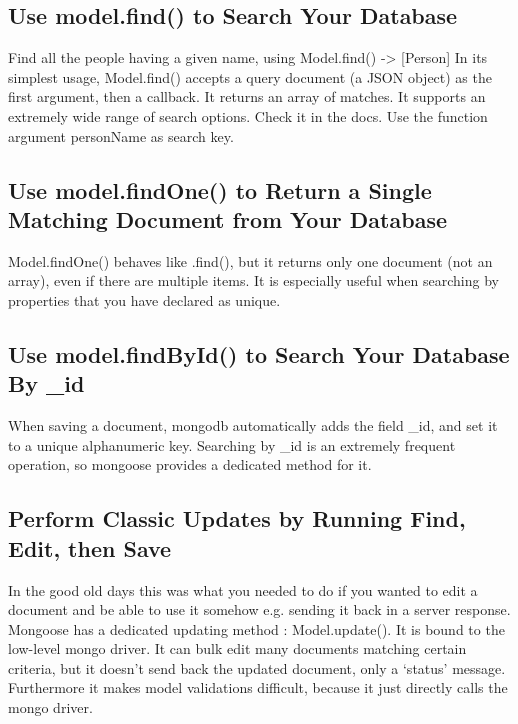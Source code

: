 \documentclass{article}%
\begin{document}
%
\subsection{Use model.find() to Search Your Database}%
\label{subsec:Usemodel.find()toSearchYourDatabase}%
Find all the people having a given name, using Model.find() {-}> {[}Person{]}\newline%
In its simplest usage, Model.find() accepts a query document (a JSON object) as the first argument, then a callback. It returns an array of matches. It supports an extremely wide range of search options. Check it in the docs. Use the function argument personName as search key.\newline%

%
\subsection{Use model.findOne() to Return a Single Matching Document from Your Database}%
\label{subsec:Usemodel.findOne()toReturnaSingleMatchingDocumentfromYourDatabase}%
Model.findOne() behaves like .find(), but it returns only one document (not an array), even if there are multiple items. It is especially useful when searching by properties that you have declared as unique. \newline%

%
\subsection{Use model.findById() to Search Your Database By \_id}%
\label{subsec:Usemodel.findById()toSearchYourDatabaseByid}%
When saving a document, mongodb automatically adds the field \_id, and set it to a unique alphanumeric key. Searching by \_id is an extremely frequent operation, so mongoose provides a dedicated method for it. \newline%

%
\subsection{Perform Classic Updates by Running Find, Edit, then Save}%
\label{subsec:PerformClassicUpdatesbyRunningFind,Edit,thenSave}%
In the good old days this was what you needed to do if you wanted to edit a document and be able to use it somehow e.g. sending it back in a server response. Mongoose has a dedicated updating method : Model.update(). It is bound to the low{-}level mongo driver. It can bulk edit many documents matching certain criteria, but it doesn’t send back the updated document, only a ‘status’ message. Furthermore it makes model validations difficult, because it just directly calls the mongo driver.\newline%
\end{document}
